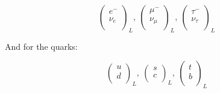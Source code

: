 \begin{equation}
  \label{eq:lepDoublets}
  \begin{pmatrix}
    e^{-} \\
    \nu_e \\
  \end{pmatrix}_L,\:  
  \begin{pmatrix}                                                                                                                                   \mu^{-} \\
    \nu_\mu \\     
  \end{pmatrix}_L,\: 
  \begin{pmatrix}                                                                                                                             
    \tau^{-} \\
    \nu_\tau \\                                                    
  \end{pmatrix}_L
\end{equation}

And for the quarks:

\begin{equation}        
  \label{eq:quarkDoublets}
  \begin{pmatrix}                                                                                                                               
    u \\                                                                                                                                  
    d \\                                                                                                                                  
  \end{pmatrix}_L,\:                                                                                                                           
  \begin{pmatrix}                                                                                         
    s \\                                         
    c \\                                                                                                                             
  \end{pmatrix}_L,\:                                                                                                                           
  \begin{pmatrix}     
    t \\                                                                                                                            
    b \\                                                                                                                            
  \end{pmatrix}_L                
\end{equation}

